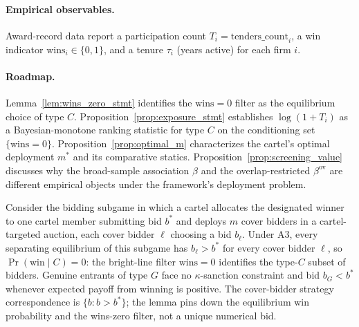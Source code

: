 \paragraph{Empirical observables.} Award-record data report a
participation count $T_i = \text{tenders\_count}_i$, a win
indicator $\text{wins}_i \in \{0, 1\}$, and a tenure $\tau_i$
(years active) for each firm $i$.

\paragraph{Roadmap.} Lemma~\ref{lem:wins_zero_stmt} identifies
the $\text{wins} = 0$ filter as the equilibrium choice of
type $C$. Proposition~\ref{prop:exposure_stmt} establishes
$\log(1 + T_i)$ as a Bayesian-monotone ranking statistic for
type $C$ on the conditioning set $\{\text{wins} = 0\}$.
Proposition~\ref{prop:optimal_m} characterizes the cartel's
optimal deployment $m^*$ and its comparative statics.
Proposition~\ref{prop:screening_value} discusses why the
broad-sample association $\beta$ and the overlap-restricted
$\beta^{\text{ov}}$ are different empirical objects under the
framework's deployment problem.

\begin{lemma}\label{lem:wins_zero_stmt}
Consider the bidding subgame in which a cartel allocates the
designated winner to one cartel member submitting bid $b^*$ and
deploys $m$ cover bidders in a cartel-targeted auction, each
cover bidder $\ell$ choosing a bid $b_\ell$. Under A3, every
separating equilibrium of this subgame has $b_\ell > b^*$ for
every cover bidder $\ell$, so $\Pr(\text{win} \mid C) = 0$: the
bright-line filter $\text{wins} = 0$ identifies the type-$C$
subset of bidders. Genuine entrants of type $G$ face no
$\kappa$-sanction constraint and bid $b_G < b^*$ whenever
expected payoff from winning is positive. The cover-bidder
strategy correspondence is $\{b : b > b^*\}$; the lemma pins
down the equilibrium win probability and the wins-zero filter,
not a unique numerical bid.
\end{lemma}

